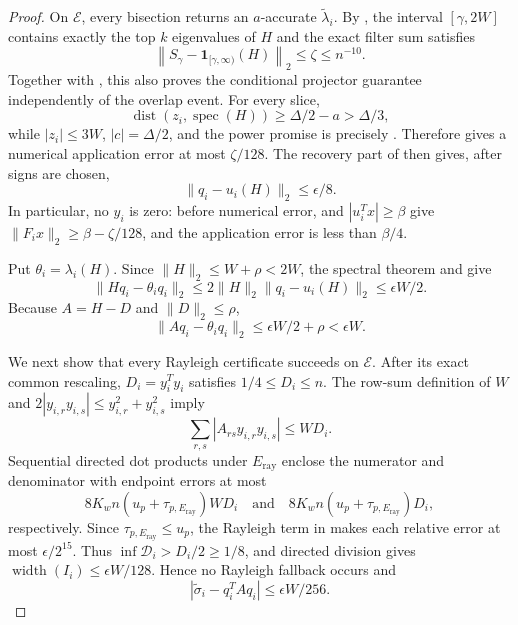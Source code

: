 \documentclass[11pt]{article}
\begin{document}
\begin{proof}
On $\mathcal E$, every bisection returns an $a$-accurate
$\widetilde\lambda_i$.  By , the interval
$[\gamma,2W]$ contains exactly the top $k$ eigenvalues of $H$ and the exact
filter sum satisfies
\begin{equation}
 \label{eq:algorithm-step-filter}
 \left\lVert S_\gamma-
 \mathbf 1_{[\gamma,\infty)}(H)\right\rVert_2
 \leq\zeta\leq n^{-10}.
\end{equation}
Together with , this also proves the
conditional projector guarantee independently of the overlap event.  For every slice,
\[
 \operatorname{dist}(z_i,\operatorname{spec}(H))
 \geq\Delta/2-a>\Delta/3,
\]
while $|z_i|\leq3W$, $|c|=\Delta/2$, and the power promise is precisely
.  Therefore
 gives a numerical application error at most
$\zeta/128$.  The recovery part of  then gives, after
signs are chosen,
\begin{equation}
 \label{eq:q-close-u}
 \lVert q_i-u_i(H)\rVert_2\leq\epsilon/8.
\end{equation}
In particular, no $y_i$ is zero: before numerical error,
 and $|u_i^Tx|\geq\beta$ give
$\lVert F_ix\rVert_2\geq\beta-\zeta/128$, and the application error is
less than $\beta/4$.

Put $\theta_i=\lambda_i(H)$.  Since
$\lVert H\rVert_2\leq W+\rho<2W$, the spectral theorem and
 give
\begin{equation}
 \label{eq:H-residual}
 \lVert Hq_i-\theta_iq_i\rVert_2
 \leq2\lVert H\rVert_2\lVert q_i-u_i(H)\rVert_2
 \leq\epsilon W/2.
\end{equation}
Because $A=H-D$ and $\lVert D\rVert_2\leq\rho$,
\begin{equation}
 \label{eq:pre-rayleigh-residual}
 \lVert Aq_i-\theta_iq_i\rVert_2
 \leq\epsilon W/2+\rho<\epsilon W.
\end{equation}

We next show that every Rayleigh certificate succeeds on $\mathcal E$.
After its exact common rescaling, $D_i=y_i^Ty_i$ satisfies
$1/4\leq D_i\leq n$.  The row-sum definition of $W$ and
$2|y_{i,r}y_{i,s}|\leq y_{i,r}^2+y_{i,s}^2$ imply
\[
 \sum_{r,s}|A_{rs}y_{i,r}y_{i,s}|\leq WD_i.
\]
Sequential directed dot products under $E_{\mathrm{ray}}$ enclose the
numerator and denominator with endpoint errors at most
\[
 8K_wn(u_p+\tau_{p,E_{\mathrm{ray}}})WD_i
 \quad\text{and}\quad
 8K_wn(u_p+\tau_{p,E_{\mathrm{ray}}})D_i,
\]
respectively.  Since $\tau_{p,E_{\mathrm{ray}}}\leq u_p$, the Rayleigh term
in  makes each relative error at most
$\epsilon/2^{15}$.  Thus $\inf\mathcal D_i>D_i/2\geq1/8$, and directed
division gives $\operatorname{width}(I_i)\leq\epsilon W/128$.  Hence no
Rayleigh fallback occurs and
\begin{equation}
 \label{eq:rayleigh-midpoint-error}
 |\widetilde\sigma_i-q_i^TAq_i|\leq\epsilon W/256.
\end{equation}


\end{proof}
\end{document}
